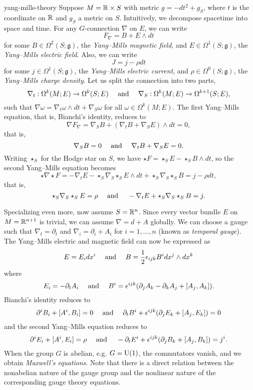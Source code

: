 \begin{example}{yang-mills-theory}
    Suppose $M = \mathbb{R} \times S$ with metric $g = -dt^2 + g_S$, where $t$ is the coordinate on $\mathbb{R}$ and $g_S$ a metric on $S$. Intuitively, we decompose spacetime into space and time. For any $G$-connection $\nabla$ on $E$, we can write
    \[ F_\nabla = B + E \wedge dt \]
    for some $B \in \Omega^2(S; \mathfrak{g})$, the \textit{Yang--Mills magnetic field}, and $E \in \Omega^1(S; \mathfrak{g})$, the \textit{Yang--Mills electric field}. Also, we can write
    \[ J = j - \rho dt \]
    for some $j \in \Omega^1(S; \mathfrak{g})$, the \textit{Yang--Mills electric current}, and $\rho \in \Omega^0(S; \mathfrak{g})$, the \textit{Yang--Mills charge density}. Let us split the connection into two parts,
    \[ \nabla_t : \Omega^k(M; E) \to \Omega^k(S; E) \quad \textup{ and } \quad \nabla_S : \Omega^k(M; E) \to \Omega^{k + 1}(S; E) , \]
    such that $\nabla \omega = \nabla_t \omega \wedge dt + \nabla_S \omega$ for all $\omega \in \Omega^k(M; E)$. The first Yang--Mills equation, that is, Bianchi's identity, reduces to
    \[ \nabla F_\nabla = \nabla_S B + (\nabla_t B + \nabla_S E) \wedge dt = 0, \]
    that is,
    \[ \nabla_S B = 0 \quad \textup{ and } \quad \nabla_t B + \nabla_S E = 0 . \]
    Writing $\star_S$ for the Hodge star on $S$, we have $\star F = \star_S E - \star_S B \wedge dt$, so the second Yang--Mills equation becomes
    \[ \star \nabla \star F = - \nabla_t E - \star_S \nabla_S \star_S E \wedge dt + \star_S \nabla_S \star_S B = j - \rho dt , \]
    that is,
    \[ \star_S \nabla_S \star_S E = \rho \quad \textup{ and } \quad - \nabla_t E + \star_S \nabla_S \star_S B = j . \]
    
    Specializing even more, now assume $S = \mathbb{R}^n$. Since every vector bundle $E$ on $M = \mathbb{R}^{n + 1}$ is trivial, we can assume $\nabla = d + A$ globally. We can choose a gauge such that $\nabla_t = \partial_t$ and $\nabla_i = \partial_i + A_i$ for $i = 1, \ldots, n$ (known as \textit{temporal gauge}). The Yang--Mills electric and magnetic field can now be expressed as
    \[ E = E_i dx^i \quad \textup{ and } \quad B = \frac{1}{2} \epsilon_{ijk} B^i dx^j \wedge dx^k \]
    where
    \[ E_i = - \partial_t A_i \quad \textup{ and } \quad B^i = \epsilon^{ijk} ( \partial_j A_k - \partial_k A_j + [A_j, A_k] ) . \]
    Bianchi's identity reduces to
    \[ \partial^i B_i + [A^i, B_i] = 0 \quad \textup{ and } \quad \partial_t B^i + \epsilon^{ijk} (\partial_j E_k + [A_j, E_k]) = 0 \]
    and the second Yang--Mills equation reduces to
    \[ \partial^i E_i + [A^i, E_i] = \rho \quad \textup{ and } \quad - \partial_t E^i + \epsilon^{ijk} (\partial_j B_k + [A_j, B_k]) = j^i . \]
    When the group $G$ is abelian, e.g. $G = \textup{U}(1)$, the commutators vanish, and we obtain \textit{Maxwell's equations}. Note that there is a direct relation between the nonabelian nature of the gauge group and the nonlinear nature of the corresponding gauge theory equations.
\end{example}


